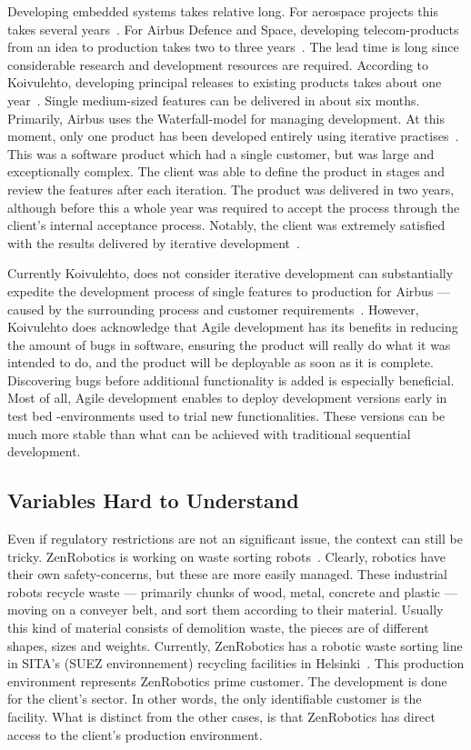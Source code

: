 \documentclass[english]{tktltiki2}
\begin{document}
Developing embedded systems takes relative long. For aerospace projects this takes several years~\cite{Hol15b}. For Airbus Defence and Space, developing telecom-products from an idea to production takes two to three years~\cite{Koi15}. The lead time is long since considerable research and development resources are required. According to Koivulehto, developing principal releases to existing products takes about one year~\cite{Koi15}. Single medium-sized features can be delivered in about six months. Primarily, Airbus uses the Waterfall-model for managing development. At this moment, only one product has been developed entirely using iterative practises~\cite{Koi15}. This was a software product which had a single customer, but was large and exceptionally complex. The client was able to define the product in stages and review the features after each iteration. The product was delivered in two years, although before this a whole year was required to accept the process through the client’s internal acceptance process. Notably, the client was extremely satisfied with the results delivered by iterative development~\cite{Koi15}.

Currently Koivulehto, does not consider iterative development can substantially expedite the development process of single features to production for Airbus — caused by the surrounding process and customer requirements~\cite{Koi15}. However, Koivulehto does acknowledge that Agile development has its benefits in reducing the amount of bugs in software, ensuring the product will really do what it was intended to do, and the product will be deployable as soon as it is complete. Discovering bugs before additional functionality is added is especially beneficial. Most of all, Agile development enables to deploy development versions early in test bed -environments used to trial new functionalities. These versions can be much more stable than what can be achieved with traditional sequential development.

\subsection{Variables Hard to Understand}

Even if regulatory restrictions are not an significant issue, the context can still be tricky. ZenRobotics is working on waste sorting robots~\cite{Hol15a}. Clearly, robotics have their own safety-concerns, but these are more easily managed. These industrial robots recycle waste — primarily chunks of wood, metal, concrete and plastic — moving on a conveyer belt, and sort them according to their material. Usually this kind of material consists of demolition waste, the pieces are of different shapes, sizes and weights. Currently, ZenRobotics has a robotic waste sorting line in SITA’s (SUEZ environnement) recycling facilities in Helsinki~\cite{SITA, Hol15a}. This production environment represents ZenRobotics prime customer. The development is done for the client’s sector. In other words, the only identifiable customer is the facility. What is distinct from the other cases, is that ZenRobotics has direct access to the client’s production environment.
\end{document}
